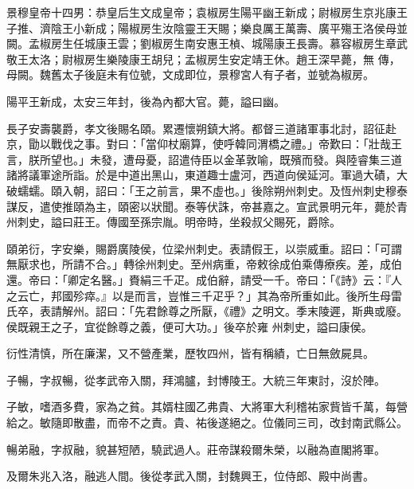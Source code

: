 
\begin{pinyinscope}

 景穆皇帝十四男：恭皇后生文成皇帝；袁椒房生陽平幽王新成；尉椒房生京兆康王子推、濟陰王小新成；陽椒房生汝陰靈王天賜；樂良厲王萬壽、廣平殤王洛侯母並闕。孟椒房生任城康王雲；劉椒房生南安惠王楨、城陽康王長壽。慕容椒房生章武敬王太洛；尉椒房生樂陵康王胡兒；孟椒房生安定靖王休。趙王深早薨，無
 傳，母闕。魏舊太子後庭未有位號，文成即位，景穆宮人有子者，並號為椒房。



 陽平王新成，太安三年封，後為內都大官。薨，謚曰幽。



 長子安壽襲爵，孝文後賜名頤。累遷懷朔鎮大將。都督三道諸軍事北討，詔征赴京，勖以戰伐之事。對曰：「當仰杖廟算，使呼韓同渭橋之禮。」帝歎曰：「壯哉王言，朕所望也。」未發，遭母憂，詔遣侍臣以金革敦喻，既殯而發。與陸睿集三道諸將議軍途所詣。於是中道出黑山，東道趣士盧河，西道向侯延河。軍過大磧，大破蠕蠕。頤入朝，詔曰：「王之前言，果不虛也。」後除朔州刺史。及恆州刺史穆泰
 謀反，遣使推頤為主，頤密以狀聞。泰等伏誅，帝甚嘉之。宣武景明元年，薨於青州刺史，謚曰莊王。傳國至孫宗胤。明帝時，坐殺叔父賜死，爵除。



 頤弟衍，字安樂，賜爵廣陵侯，位梁州刺史。表請假王，以崇威重。詔曰：「可謂無厭求也，所請不合。」轉徐州刺史。至州病重，帝敕徐成伯乘傳療疾。差，成伯還。帝曰：「卿定名醫。」賚絹三千疋。成伯辭，請受一千。帝曰：「《詩》云：『人之云亡，邦國殄瘁。』以是而言，豈惟三千疋乎？」其為帝所重如此。後所生母雷氏卒，表請解州。詔曰：「先君餘尊之所厭，《禮》之明文。季末陵遲，斯典或廢。侯既親王之子，宜從餘尊之義，便可大功。」後卒於雍
 州刺史，謚曰康侯。



 衍性清慎，所在廉潔，又不營產業，歷牧四州，皆有稱績，亡日無斂屍具。



 子暢，字叔暢，從孝武帝入關，拜鴻臚，封博陵王。大統三年東討，沒於陣。



 子敏，嗜酒多費，家為之貧。其婿柱國乙弗貴、大將軍大利稽祐家貲皆千萬，每營給之。敏隨即散盡，而帝不之責。貴、祐後遂絕之。位儀同三司，改封南武縣公。



 暢弟融，字叔融，貌甚短陋，驍武過人。莊帝謀殺爾朱榮，以融為直閣將軍。



 及爾朱兆入洛，融逃人間。後從孝武入關，封魏興王，位侍郎、殿中尚書。




\end{pinyinscope}
